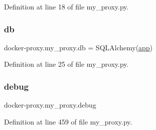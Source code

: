 Definition at line 18 of file my\+\_\+proxy.\+py.

\hypertarget{namespacedocker-proxy_1_1my__proxy_a3cda0544280d27f01985434ab3efa4b3}{}\label{namespacedocker-proxy_1_1my__proxy_a3cda0544280d27f01985434ab3efa4b3} 
\subsubsection{\texorpdfstring{db}{db}}
{\footnotesize\ttfamily docker-\/proxy.\+my\+\_\+proxy.\+db = S\+Q\+L\+Alchemy(\hyperlink{namespacedocker-proxy_1_1my__proxy_a1316b64a06ccf8940bd886efa8d18660}{app})}



Definition at line 25 of file my\+\_\+proxy.\+py.

\hypertarget{namespacedocker-proxy_1_1my__proxy_a4cb4fb47e79c0c24a5b66136731a0b0c}{}\label{namespacedocker-proxy_1_1my__proxy_a4cb4fb47e79c0c24a5b66136731a0b0c} 
\subsubsection{\texorpdfstring{debug}{debug}}
{\footnotesize\ttfamily docker-\/proxy.\+my\+\_\+proxy.\+debug}



Definition at line 459 of file my\+\_\+proxy.\+py.

